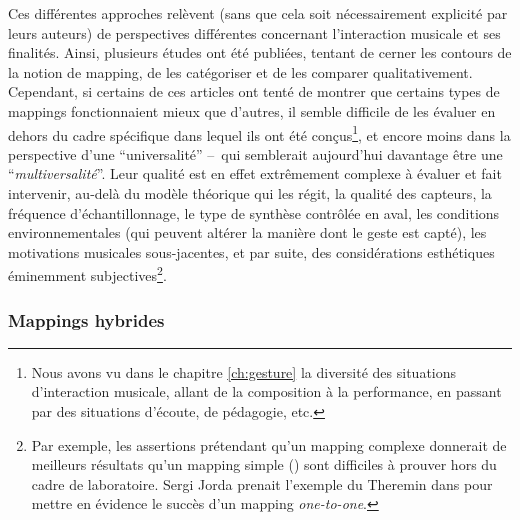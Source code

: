 \noindent Ces différentes approches relèvent (sans que cela soit nécessairement explicité par leurs auteurs) de perspectives différentes concernant l'interaction musicale et ses finalités. Ainsi, plusieurs études ont été publiées, tentant de cerner les contours de la notion de mapping, de les catégoriser et de les comparer qualitativement. Cependant, si certains de ces articles ont tenté de montrer que certains types de mappings fonctionnaient mieux que d'autres, il semble difficile de les évaluer en dehors du cadre spécifique dans lequel ils ont été conçus\footnote{Nous avons vu dans le chapitre \ref{ch:gesture} la diversité des situations d'interaction musicale, allant de la composition à la performance, en passant par des situations d'écoute, de pédagogie, etc.}, et encore moins dans la perspective d'une ``universalité'' --~qui semblerait aujourd'hui davantage être une ``\textit{multiversalité}''. Leur qualité est en effet extrêmement complexe à évaluer et fait intervenir, au-delà du modèle théorique qui les régit, la qualité des capteurs, la fréquence d'échantillonnage, le type de synthèse contrôlée en aval, les conditions environnementales (qui peuvent altérer la manière dont le geste est capté), les motivations musicales sous-jacentes, et par suite, des considérations esthétiques éminemment subjectives\footnote{Par exemple, les assertions prétendant qu'un mapping complexe donnerait de meilleurs résultats qu'un mapping simple (\cite{rovan_instrumental_1997, hunt_mapping_2000}) sont difficiles à prouver hors du cadre de laboratoire. Sergi Jorda prenait l'exemple du Theremin dans \cite{jorda_digital_2005} pour mettre en évidence le succès d'un mapping \textit{one-to-one}.}.

\subsubsection{Mappings hybrides} 

